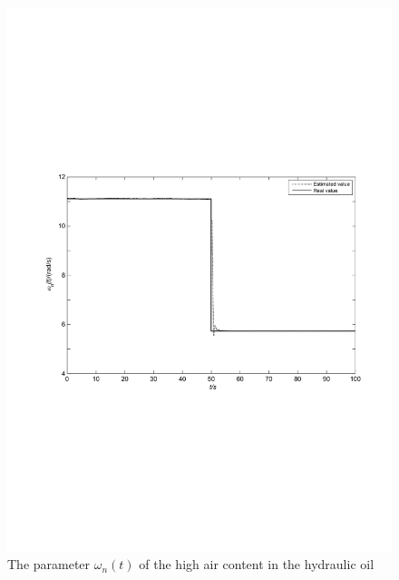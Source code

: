 \documentclass{article}
\begin{document}
\begin{figure}[!htb]
  \centering
  \includegraphics[width=\hsize]{fig4a.pdf}
  \caption{The parameter $\omega_n(t)$ of the high air content in the hydraulic oil}
  \label{fig:4}
\end{figure}
\end{document}
